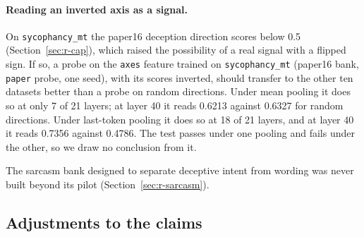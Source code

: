 \paragraph{Reading an inverted axis as a signal.}
On \texttt{sycophancy\_mt} the paper16 deception direction scores below 0.5 (Section~\ref{sec:r-cap}), which raised the possibility of a real signal with a flipped sign. %
If so, a probe on the \texttt{axes} feature trained on \texttt{sycophancy\_mt} (paper16 bank, \texttt{paper} probe, one seed), with its scores inverted, should transfer to the other ten datasets better than a probe on random directions. %
Under mean pooling it does so at only 7 of 21 layers; at layer 40 it reads 0.6213 against 0.6327 for random directions. %
Under last-token pooling it does so at 18 of 21 layers, and at layer 40 it reads 0.7356 against 0.4786. %
The test passes under one pooling and fails under the other, so we draw no conclusion from it. %

The sarcasm bank designed to separate deceptive intent from wording was never built beyond its pilot (Section~\ref{sec:r-sarcasm}). %

\subsection{Adjustments to the claims}
\label{sec:r-claims}

